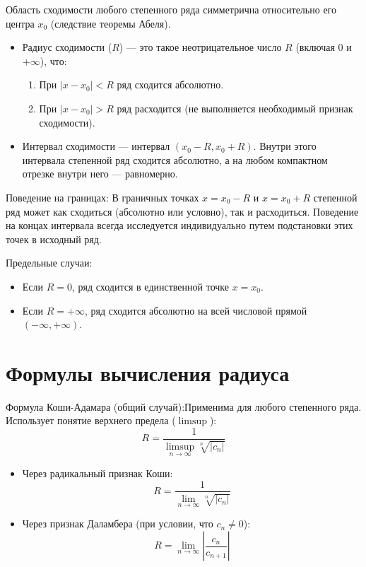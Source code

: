 \documentclass[14pt]{extreport}
\begin{document}
    Область сходимости любого степенного ряда симметрична относительно его центра $x_0$ (следствие теоремы Абеля).

    \begin{itemize}
        \item Радиус сходимости ($R$) — это такое неотрицательное число $R$ (включая $0$ и $+\infty$), что:
        \begin{enumerate}
            \item При $|x - x_0| < R$ ряд сходится абсолютно.
            \item При $|x - x_0| > R$ ряд расходится (не выполняется необходимый признак сходимости).
        \end{enumerate}
        \item Интервал сходимости — интервал $(x_0 - R, x_0 + R)$. Внутри этого интервала степенной ряд сходится абсолютно, а на любом компактном отрезке внутри него — равномерно.

    \end{itemize}


    Поведение на границах: В граничных точках $x = x_0 - R$ и $x = x_0 + R$ степенной ряд может как сходиться (абсолютно или условно), так и расходиться. Поведение на концах интервала всегда исследуется индивидуально путем подстановки этих точек в исходный ряд.

    Предельные случаи:
    \begin{itemize}
        \item Если $R = 0$, ряд сходится в единственной точке $x = x_0$.
        \item Если $R = +\infty$, ряд сходится абсолютно на всей числовой прямой $(-\infty, +\infty)$.
    \end{itemize}

    \section{Формулы вычисления радиуса}
    Формула Коши-Адамара (общий случай):Применима для любого степенного ряда. Использует понятие верхнего предела ($\limsup$):$$R = \frac{1}{\limsup_{n \to \infty} \sqrt[n]{|c_n|}}$$

    \begin{itemize}
        \item Через радикальный признак Коши:
        $$R = \frac{1}{\lim_{n \to \infty} \sqrt[n]{|c_n|}}$$
        \item Через признак Даламбера (при условии, что $c_n \neq 0$):$$R = \lim_{n \to \infty} \left| \frac{c_n}{c_{n+1}} \right|$$
    \end{itemize}
\end{document}
